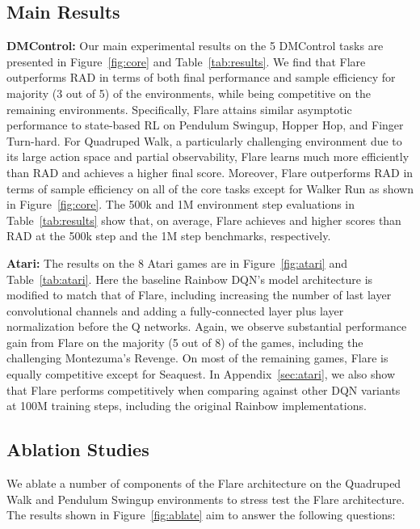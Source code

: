 \documentclass{article} \usepackage{iclr2021_conference,times}
\begin{document}
\subsection{Main Results}\label{sec:results}
\iffalse
\begin{enumerate}
    \item refer to some curve or table or bar plots.
 
    \item Figure 4 - challenging tasks ACL vs baselines (RAD, Dreamer, PlaNet)
\end{enumerate}
\fi
\textbf{DMControl:} Our main experimental results on the 5 DMControl tasks are presented in Figure~\ref{fig:core} and Table~\ref{tab:results}. We find that Flare outperforms RAD in terms of both final performance and sample efficiency for majority (3 out of 5) of the environments, while being competitive on the remaining environments. Specifically, Flare attains similar asymptotic performance to state-based RL on Pendulum Swingup, Hopper Hop, and Finger Turn-hard. For Quadruped Walk, a particularly challenging environment due to its large action space and partial observability, Flare learns much more efficiently than RAD and achieves a higher final score. Moreover, Flare outperforms RAD in terms of sample efficiency on all of the core tasks except for Walker Run as shown in Figure~\ref{fig:core}. The 500k and 1M environment step evaluations in Table~\ref{tab:results} show that, on average, Flare achieves   and  higher scores than RAD at the 500k step and the 1M step benchmarks, respectively. 


\textbf{Atari:} The results on the 8 Atari games are in Figure~\ref{fig:atari} and Table~\ref{tab:atari}. Here the baseline Rainbow DQN's model architecture is modified to match that of Flare, including increasing the number of last layer convolutional channels and adding a fully-connected layer plus layer normalization before the Q networks. Again, we observe substantial performance gain from Flare on the majority (5 out of 8) of the games, including the challenging Montezuma's Revenge. On most of the remaining games, Flare is equally competitive except for Seaquest.
In Appendix~\ref{sec:atari}, we also show that Flare performs competitively when comparing against other DQN variants at 100M training steps, including the original Rainbow implementations.
\subsection{Ablation Studies}\label{sec:ablate}
We ablate a number of components of the Flare architecture on the Quadruped Walk and Pendulum Swingup environments to stress test the Flare architecture. The results shown in Figure~\ref{fig:ablate} aim to answer the following questions:
\end{document}
